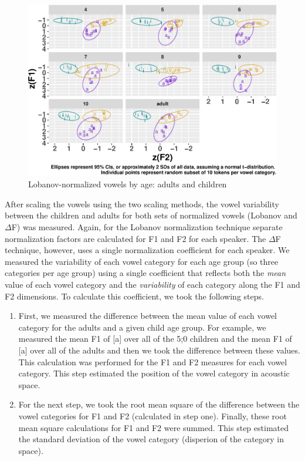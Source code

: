 \documentclass[
]{article}
\begin{document}
\begin{figure}
\centering
\includegraphics{3_vtl_results_files/figure-latex/plot-raw-lobanov-data-1.pdf}
\caption{\label{fig:plot-raw-lobanov-data}Lobanov-normalized vowels by age:
adults and children}
\end{figure}

After scaling the vowels using the two scaling methods, the vowel variability between the children and adults for both sets of normalized vowels (Lobanov and \(\Delta\)F) was measured. Again, for the Lobanov normalization technique separate normalization factors are calculated for F1 and F2 for each speaker. The \(\Delta\)F technique, however, uses a single normalization coefficient for each speaker. We measured the variability of each vowel category for each age group (so three categories per age group) using a single coefficient that reflects both the \emph{mean} value of each vowel category and the \emph{variability} of each category along the F1 and F2 dimensions. To calculate this coefficient, we took the following steps.

\begin{enumerate}
\def\labelenumi{\arabic{enumi}.}
\item
  First, we measured the difference between the mean value of each vowel category for the adults and a given child age group. For example, we measured the mean F1 of {[}a{]} over all of the 5;0 children and the mean F1 of {[}a{]} over all of the adults and then we took the difference between these values. This calculation was performed for the F1 and F2 measures for each vowel category. This step estimated the position of the vowel category in acoustic space.
\item
  For the next step, we took the root mean square of the difference between the vowel categories for F1 and F2 (calculated in step one). Finally, these root mean square calculations for F1 and F2 were summed. This step estimated the standard deviation of the vowel category (disperion of the category in space).
\end{enumerate}
\end{document}
